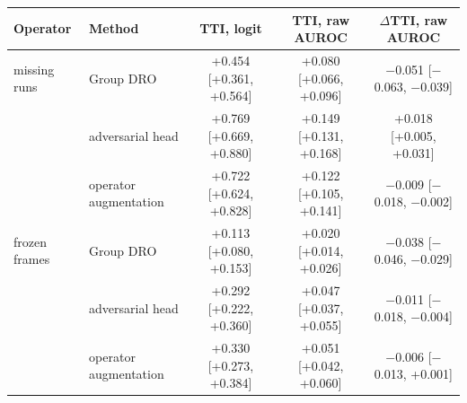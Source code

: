 \begin{tabular}{@{}llccc@{}}
\toprule
Operator & Method & TTI, logit & TTI, raw AUROC & $\Delta$TTI, raw AUROC \\
\midrule
missing runs & Group DRO & +0.454 [+0.361, +0.564] & +0.080 [+0.066, +0.096] & $-$0.051 [$-$0.063, $-$0.039] \\
 & adversarial head & +0.769 [+0.669, +0.880] & +0.149 [+0.131, +0.168] & +0.018 [+0.005, +0.031] \\
 & operator augmentation & +0.722 [+0.624, +0.828] & +0.122 [+0.105, +0.141] & $-$0.009 [$-$0.018, $-$0.002] \\
\addlinespace
frozen frames & Group DRO & +0.113 [+0.080, +0.153] & +0.020 [+0.014, +0.026] & $-$0.038 [$-$0.046, $-$0.029] \\
 & adversarial head & +0.292 [+0.222, +0.360] & +0.047 [+0.037, +0.055] & $-$0.011 [$-$0.018, $-$0.004] \\
 & operator augmentation & +0.330 [+0.273, +0.384] & +0.051 [+0.042, +0.060] & $-$0.006 [$-$0.013, +0.001] \\
\bottomrule
\end{tabular}
